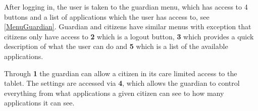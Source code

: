 
After logging in, the user is taken to the guardian menu, which has access to 4
buttons and a list of applications which the user has access to,
see \autoref{MenuGuardian}. Guardian and citizens have similar menus with
exception that citizens only have access to \textbf{2} which is a logout button,
\textbf{3} which provides a quick description of what the user can do and
\textbf{5} which is a list of the available applications.


Through \textbf{1} the guardian can allow a citizen in its care limited access
to the tablet. The settings are accessed via \textbf{4}, which allows the
guardian to control everything from what applications a given citizen can see to
how many applications it can see.


% 
% 
% 
% 
% 

